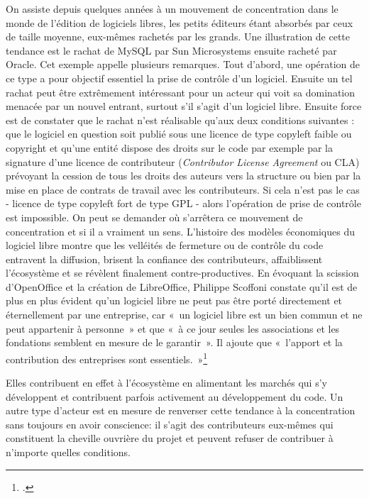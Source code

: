 \documentclass{FramateX}
\begin{document}
\begin{refsection}
On assiste depuis quelques années à un mouvement de concentration dans
le monde de l'édition de logiciels libres, les petits éditeurs étant
absorbés par ceux de taille moyenne, eux-mêmes rachetés par les grands.
Une illustration de cette tendance est le rachat de MySQL par Sun
Microsystems ensuite racheté par Oracle. Cet exemple appelle plusieurs
remarques. Tout d'abord, une opération de ce type a pour objectif
essentiel la prise de contrôle d'un logiciel. Ensuite un tel rachat
peut être extrêmement intéressant pour un acteur qui voit sa domination
menacée par un nouvel entrant, surtout s'il s'agit d'un logiciel libre.
Ensuite force est de constater que le rachat n'est réalisable qu'aux
deux conditions suivantes : que le logiciel en question soit publié
sous une licence de type copyleft faible ou copyright et qu'une entité
dispose des droits sur le code par exemple par la signature d'une
licence de contributeur (\textit{Contributor License Agreement} ou CLA)
prévoyant la cession de tous les droits des auteurs vers la structure
ou bien par la mise en place de contrats de travail avec les
contributeurs. Si cela n'est pas le cas - licence de type copyleft fort
de type GPL - alors l'opération de prise de contrôle est impossible. On
peut se demander où s'arrêtera ce mouvement de concentration et si il a
vraiment un sens. L'histoire des modèles économiques du logiciel libre
montre que les velléités de fermeture ou de contrôle du code entravent
la diffusion, brisent la confiance des contributeurs, affaiblissent
l'écosystème et se révèlent finalement contre-productives. En évoquant
la scission d'OpenOffice et la création de LibreOffice, Philippe
Scoffoni constate qu'il est de plus en plus évident qu'un logiciel
libre ne peut pas être porté directement et éternellement par une
entreprise, car «~un logiciel libre est un bien commun et ne peut
appartenir à personne~» et que «~à ce jour seules les associations et
les fondations semblent en mesure de le garantir~». Il ajoute que
«~l'apport et la contribution des entreprises sont essentiels.~»\footnote{\cite{scoffonilibreoffice2011}.}

Elles contribuent en effet à l'écosystème en
alimentant les marchés qui s'y développent et contribuent parfois
activement au développement du code. Un autre type d'acteur est en
mesure de renverser cette tendance à la concentration sans toujours en
avoir conscience: il s'agit des contributeurs
eux-mêmes qui constituent la cheville ouvrière du projet et peuvent
refuser de contribuer à n'importe quelles conditions.



\end{refsection}
\end{document}
